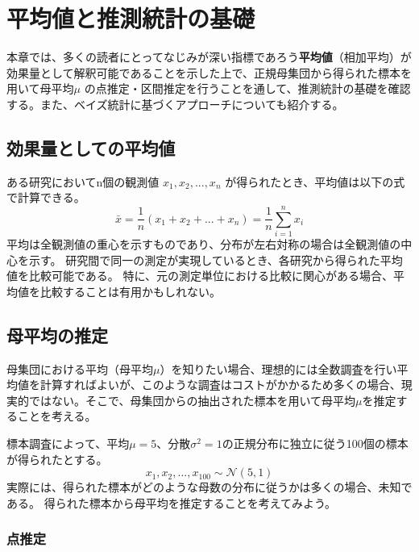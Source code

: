 \documentclass[
  ja=standard, xelatex, base=12pt]{bxjsreport}
\begin{document}
\hypertarget{ux5e73ux5747ux5024ux3068ux63a8ux6e2cux7d71ux8a08ux306eux57faux790e}{%
\chapter{平均値と推測統計の基礎}\label{ux5e73ux5747ux5024ux3068ux63a8ux6e2cux7d71ux8a08ux306eux57faux790e}}

本章では、多くの読者にとってなじみが深い指標であろう\textbf{平均値}（相加平均）が効果量として解釈可能であることを示した上で、正規母集団から得られた標本を用いて母平均\(\mu\) の点推定・区間推定を行うことを通して、推測統計の基礎を確認する。また、ベイズ統計に基づくアプローチについても紹介する。

\hypertarget{ux52b9ux679cux91cfux3068ux3057ux3066ux306eux5e73ux5747ux5024}{%
\section{効果量としての平均値}\label{ux52b9ux679cux91cfux3068ux3057ux3066ux306eux5e73ux5747ux5024}}

ある研究においてn個の観測値 \(x_1, x_2, ..., x_n\) が得られたとき、平均値は以下の式で計算できる。 \[
\bar{x}=\frac{1}{n}(x_1+x_2+...+x_n)=\frac{1}{n}\sum_{i=1}^{n}x_i
\] 平均は全観測値の重心を示すものであり、分布が左右対称の場合は全観測値の中心を示す。 研究間で同一の測定が実現しているとき、各研究から得られた平均値を比較可能である。 特に、元の測定単位における比較に関心がある場合、平均値を比較することは有用かもしれない。

\hypertarget{ux6bcdux5e73ux5747ux306eux63a8ux5b9a}{%
\section{母平均の推定}\label{ux6bcdux5e73ux5747ux306eux63a8ux5b9a}}

母集団における平均（母平均\(\mu\)）を知りたい場合、理想的には全数調査を行い平均値を計算すればよいが、このような調査はコストがかかるため多くの場合、現実的ではない。そこで、母集団からの抽出された標本を用いて母平均\(\mu\)を推定することを考える。

標本調査によって、平均\(\mu=5\)、分散\(\sigma^2=1\)の正規分布に独立に従う100個の標本が得られたとする。\[
x_1, x_2, ..., x_{100} \sim \mathcal{N}(5, 1)
\] 実際には、得られた標本がどのような母数の分布に従うかは多くの場合、未知である。 得られた標本から母平均を推定することを考えてみよう。

\hypertarget{ux70b9ux63a8ux5b9a}{%
\subsection{点推定}\label{ux70b9ux63a8ux5b9a}}
\end{document}
